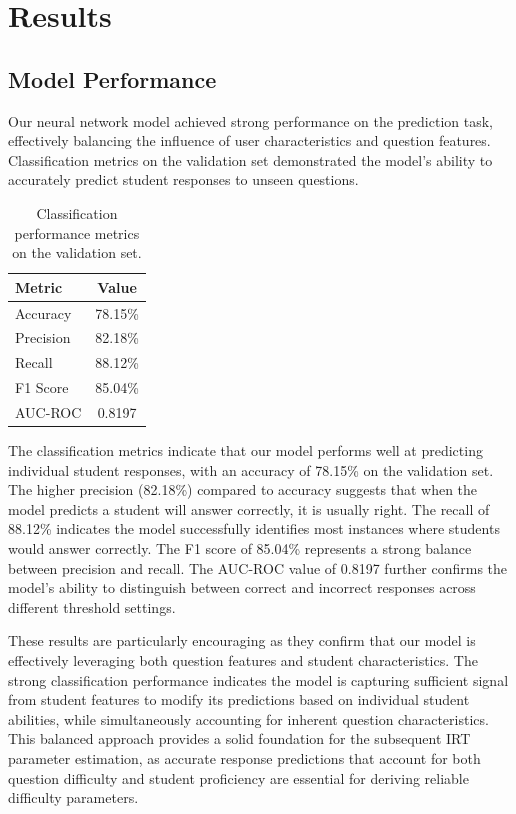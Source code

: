 \documentclass[
    a4paper, %
    10pt, %
    twoside, %
]{LTJournalArticle}
\begin{document}
\section{Results}

\subsection{Model Performance}

Our neural network model achieved strong performance on the prediction task, effectively balancing the influence of user characteristics and question features. Classification metrics on the validation set demonstrated the model's ability to accurately predict student responses to unseen questions.

\begin{table}[H]
    \centering
    \begin{tabular}{lc}
        \hline
        \textbf{Metric} & \textbf{Value} \\
        \hline
        Accuracy & 78.15\% \\
        Precision & 82.18\% \\
        Recall & 88.12\% \\
        F1 Score & 85.04\% \\
        AUC-ROC & 0.8197 \\
        \hline
    \end{tabular}
    \caption{Classification performance metrics on the validation set.}
    \label{tab:classification-metrics}
\end{table}

The classification metrics indicate that our model performs well at predicting individual student responses, with an accuracy of 78.15\% on the validation set. The higher precision (82.18\%) compared to accuracy suggests that when the model predicts a student will answer correctly, it is usually right. The recall of 88.12\% indicates the model successfully identifies most instances where students would answer correctly. The F1 score of 85.04\% represents a strong balance between precision and recall. The AUC-ROC value of 0.8197 further confirms the model's ability to distinguish between correct and incorrect responses across different threshold settings.

These results are particularly encouraging as they confirm that our model is effectively leveraging both question features and student characteristics. The strong classification performance indicates the model is capturing sufficient signal from student features to modify its predictions based on individual student abilities, while simultaneously accounting for inherent question characteristics. This balanced approach provides a solid foundation for the subsequent IRT parameter estimation, as accurate response predictions that account for both question difficulty and student proficiency are essential for deriving reliable difficulty parameters.
\end{document}
